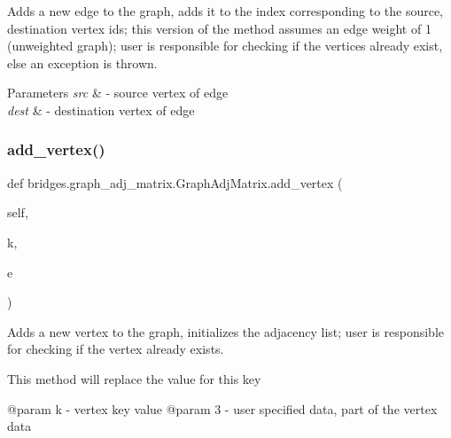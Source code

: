 Adds a new edge to the graph, adds it to the index corresponding to the source, destination vertex ids; this version of the method assumes an edge weight of 1 (unweighted graph); user is responsible for checking if the vertices already exist, else an exception is thrown. 


\begin{DoxyParams}{Parameters}
{\em src} & -\/ source vertex of edge \\
\hline
{\em dest} & -\/ destination vertex of edge \\
\hline
\end{DoxyParams}
\mbox{\label{classbridges_1_1graph__adj__matrix_1_1_graph_adj_matrix_aa6fa31ebae643950dd33628269136d00}} 
\subsubsection{\texorpdfstring{add\+\_\+vertex()}{add\_vertex()}}
{\footnotesize\ttfamily def bridges.\+graph\+\_\+adj\+\_\+matrix.\+Graph\+Adj\+Matrix.\+add\+\_\+vertex (\begin{DoxyParamCaption}\item[{}]{self,  }\item[{}]{k,  }\item[{}]{e }\end{DoxyParamCaption})}



Adds a new vertex to the graph, initializes the adjacency list; user is responsible for checking if the vertex already exists. 

This method will replace the value for this key \begin{DoxyVerb}@param k - vertex key value
@param 3 - user specified data, part of the vertex data\end{DoxyVerb}
 \mbox{\label{classbridges_1_1graph__adj__matrix_1_1_graph_adj_matrix_aa64d4ed1525c6b4959269df0e4090e01}} 
